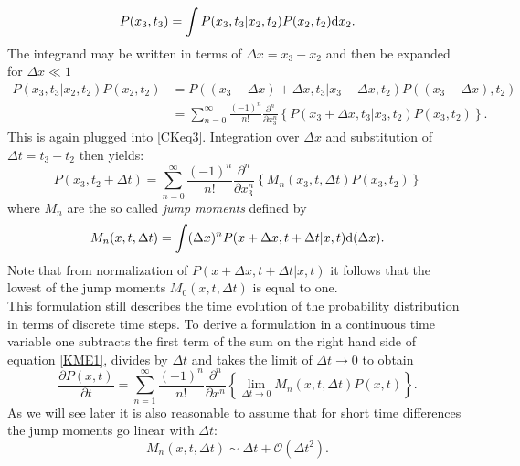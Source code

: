 \begin{equation}
    P(x_3,t_3) = \int P(x_3,t_3|x_2,t_2)P(x_2,t_2) {\rm d} x_2.
    \label{CKeq3}
\end{equation}
The integrand may be written in terms of $\Delta x = x_3 - x_2$ and then be expanded for $\Delta x \ll 1$
\begin{align}
    P(x_3,t_3|x_2,t_2)P(x_2,t_2) &= P( (x_3 - \Delta x) + \Delta x, t_3|x_3 - \Delta x, t_2)P( (x_3 - \Delta x), t_2) \nonumber \\
    &= \sum_{n=0}^{\infty} \frac{(-1)^{n}}{n!}\frac{\partial^{n}}{\partial x_3^{n}}\left\{P(x_3 + \Delta x, t_3|x_3,t_2) P(x_3,t_2)\right\}.
\end{align}
This is again plugged into \eqref{CKeq3}. Integration over $\Delta x$ and substitution of $\Delta t = t_3 - t_2$ then yields:
\begin{equation}
    P(x_3,t_2 + \Delta t) = \sum_{n=0}^{\infty} \frac{(-1)^{n}}{n!}\frac{\partial^{n}}{\partial x_3^{n}}\left\{ M_{n}(x_3,t,\Delta t) P(x_3,t_2) \right\}
    \label{KME1}
\end{equation}
where $M_n$ are the so called \textit{jump moments} defined by
\begin{equation}
    M_n(x,t,\Delta t) = \int (\Delta x)^{n} P(x + \Delta x, t + \Delta t | x, t) {\rm d} (\Delta x).
    \label{Jump_moments}
\end{equation}
Note that from normalization of $P(x+\Delta x, t+ \Delta t|x,t)$ it follows that the lowest of the jump moments $ M_0(x,t,\Delta t) $ is equal to one. \\
This formulation still describes the time evolution of the probability distribution in terms of discrete time steps. To derive a formulation in a continuous time variable one subtracts the first term of the sum on the right hand side of equation \eqref{KME1}, divides by $\Delta t$ and takes the limit of $\Delta t \rightarrow 0$ to obtain \\
\begin{equation}
    \frac{\partial P(x,t)}{\partial t} = \sum_{n = 1}^{\infty}\frac{(-1)^{n}}{n!}\frac{\partial^n}{\partial x^n} \left\{ \lim_{\Delta t \rightarrow 0} M_n(x,t,\Delta t) P(x,t) \right\}.
    \label{KME2}
\end{equation}
As we will see later it is also reasonable to assume that for short time differences the jump moments go linear with $\Delta t$:
\begin{equation}
    M_{n}(x,t,\Delta t) \sim \Delta t + \mathcal{O}(\Delta t^{2}).
\end{equation}
